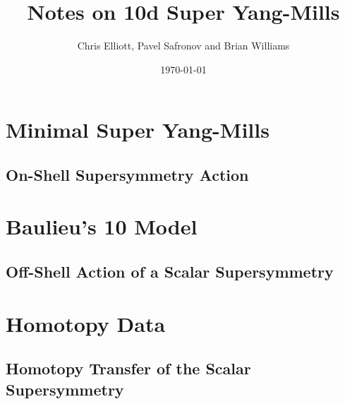 \documentclass[10pt, oneside]{article}
\title{Notes on 10d Super Yang-Mills}
\author{Chris Elliott, Pavel Safronov and Brian Williams}
\date{\today}
\begin{document}
\maketitle

\section{Minimal Super Yang-Mills}

\subsection{On-Shell Supersymmetry Action}

\section{Baulieu's 10 Model}

\subsection{Off-Shell Action of a Scalar Supersymmetry}

\section{Homotopy Data}

\subsection{Homotopy Transfer of the Scalar Supersymmetry}



\pagestyle{bib}
\printbibliography
\end{document}
